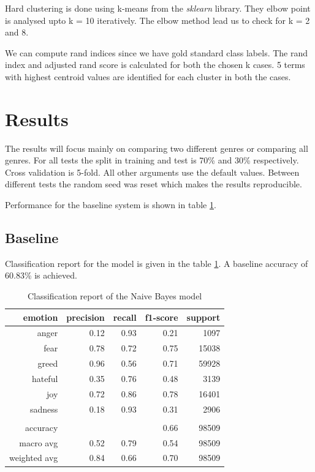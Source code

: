 \documentclass[a4paper, 12pt]{article}
\begin{document}
Hard clustering is done using k-means from the \textit{sklearn} library. They elbow point is analysed upto k = 10 iteratively. 
The elbow method lead us to check for k = 2 and 8.

We can compute rand indices since we have gold standard class labels. The rand index and adjusted rand score is calculated for both the chosen k cases. 5 terms with highest centroid values are identified for each cluster in both the cases.


\section{Results}
The results will focus mainly on comparing two different genres or comparing all genres.
For all tests the split in training and test is 70\% and 30\% respectively.
Cross validation is 5-fold.
All other arguments use the default values.
Between different tests the random seed was reset which makes the results reproducible.

Performance for the baseline system is shown in table \ref{tab:cr1}.

\subsection{Baseline}
Classification report for the model is given in the table \ref{tab:cr1}.
A baseline accuracy of 60.83\% is achieved.

\begin{table}[h]
\begin{center}
    \begin{tabular}{| r | r | r | r | r | }
        \hline
      emotion & precision & recall & f1-score & support \\ \hline
      anger    & 0.12  & 0.93     & 0.21   		& 1097    \\ \hline
			fear		& 0.78     & 0.72     & 0.75   & 15038 \\ \hline
      greed    & 0.96     & 0.56     & 0.71   & 59928 \\ \hline
      hateful    & 0.35     & 0.76     & 0.48   & 3139 \\ \hline
      joy       & 0.72   &0.86     & 0.78    & 16401 \\ \hline
      sadness    & 0.18    & 0.93     & 0.31  & 2906  \\ \hline
									 &      &        &           &     \\ \hline
      accuracy     &   			&   		 		& 0.66  &98509    \\ \hline
      macro avg     & 0.52   &0.79        & 0.54  &98509   \\ \hline
		  weighted avg & 0.84   &0.66       & 0.70   &98509  \\ \hline
    \end{tabular}
    \caption{Classification report of the Naive Bayes model}
    \label{tab:cr1}
\end{center}
\end{table}
\end{document}
